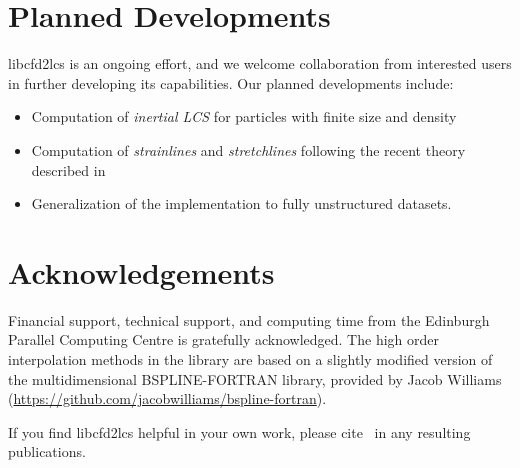 \documentclass[letterpaper,11pt]{article}
\begin{document}
\section{Planned Developments}
libcfd2lcs is an ongoing effort, and we welcome collaboration from interested users in further developing its capabilities.  Our planned developments include:
\begin{itemize}
 \item Computation of \emph{inertial LCS} for particles with finite size and density
 \item Computation of \emph{strainlines} and \emph{stretchlines} following the recent theory described in~\cite{haller2015lagrangian}
 \item Generalization of the implementation to fully unstructured datasets.
 \end{itemize}

\section{Acknowledgements}  Financial support, technical support, and computing time from the Edinburgh Parallel Computing Centre is gratefully acknowledged.   The high order interpolation methods in the library are based on a slightly modified version of the multidimensional BSPLINE-FORTRAN library, provided by Jacob Williams (\href{https://github.com/jacobwilliams/bspline-fortran}{https://github.com/jacobwilliams/bspline-fortran}).   

If you find libcfd2lcs helpful in your own work, please cite~\cite{finn2013integrated} in any resulting publications.
 
 


\end{document}
